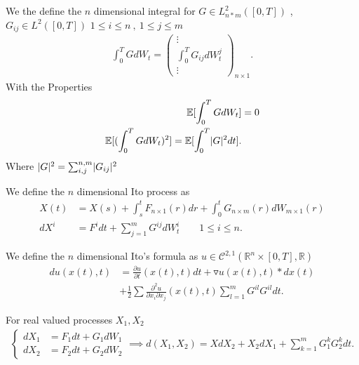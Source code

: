 \begin{definition}
  We the define the $n$ dimensional integral for $G \in  L^{2}_{n*m}([0,T]) $ , $G_{ij} \in  L^{2}([0,T])$ $1\le i\le n \ , \ 1 \le j \le m$
  \begin{align*}
    \int_0^{T} G d W_t = \begin{pmatrix} \vdots \\ \int_0^{T} G_{ij} d W^{j}_t \\ \vdots    \end{pmatrix}_{n \times 1}
  .\end{align*}
  With the Properties 
  \begin{align*}
    \mathbb{E}[\int_0^{T} G dW_t ] &= 0  \\
    \mathbb{E}[(\int_0^{T} G dW_t )^2] = \mathbb{E}[\int_0^{T} \lvert G\rvert^2 dt ]
  .\end{align*}
  Where $\lvert G\rvert^2 = \sum_{i,j}^{n,m} \lvert G_{ij}\rvert^2 $ 
\end{definition}
\begin{definition}
 We define the $n$ dimensional Ito process as  
 \begin{align*}
   X(t) &= X(s) + \int_s^{t} F_{n \times  1}(r) dr   + \int_0^{t} G_{n \times  m}(r) dW_{m \times  1}(r)  \\
   dX^{i} &= F^{i} dt + \sum_{j=1}^{m} G^{ij} dW_t^i      \qquad 1\le i \le n
 .\end{align*}
\end{definition}
\begin{theorem}
  We define the $n$ dimensional Ito's formula as $u \in  \mathcal{C}^{2,1}(\mathbb{R}^{n} \times [0,T],\mathbb{R} ) $
  \begin{align*}
    du(x(t),t) &= \frac{\partial u}{\partial t}(x(t),t) dt + \triangledown u(x(t),t) * dx(t) \\
               &+ \frac{1}{2} \sum \frac{\partial ^2 u}{\partial x_i \partial x_j}(x(t),t) \sum_{l=1}^{m}  G^{il} G^{il}dt 
  .\end{align*}
\end{theorem}
\begin{prop}
  For real valued processes $X_{1},X_{2}$
 \begin{align*}
  \begin{cases}
    dX_{1} &= F_{1} dt + G_1 dW_1 \\
    d X_2 &= F_{2} dt + G_{2} dW_2
  \end{cases} \implies d(X_{1},X_{2}) = XdX_{2} + X_{2}dX_{1} + \sum_{k=1}^{m} G_1^{k} G_2^{k} dt   
 .\end{align*} 
\end{prop}
